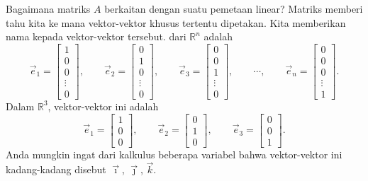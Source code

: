 Bagaimana matriks $A$ berkaitan dengan suatu pemetaan linear?
Matriks memberi tahu kita ke mana
vektor-vektor khusus tertentu dipetakan. Kita memberikan nama kepada vektor-vektor tersebut.
\emph{} dari ${\mathbb R}^n$ adalah
\begin{equation*}
\vec{e}_1 =
\begin{bmatrix}
1 \\ 0 \\ 0 \\ \vdots \\ 0
\end{bmatrix} ,
\qquad
\vec{e}_2 =
\begin{bmatrix}
0 \\ 1 \\ 0 \\ \vdots \\ 0
\end{bmatrix} ,
\qquad
\vec{e}_3 =
\begin{bmatrix}
0 \\ 0 \\ 1 \\ \vdots \\ 0
\end{bmatrix} ,
\qquad
\cdots ,
\qquad
\vec{e}_n =
\begin{bmatrix}
0 \\ 0 \\ 0 \\ \vdots \\ 1
\end{bmatrix} .
\end{equation*}
Dalam ${\mathbb R}^3$, vektor-vektor ini adalah
\begin{equation*}
\vec{e}_1 =
\begin{bmatrix}
1 \\ 0 \\ 0
\end{bmatrix} ,
\qquad
\vec{e}_2 =
\begin{bmatrix}
0 \\ 1 \\ 0
\end{bmatrix} ,
\qquad
\vec{e}_3 =
\begin{bmatrix}
0 \\ 0 \\ 1
\end{bmatrix} .
\end{equation*}
Anda mungkin ingat dari kalkulus beberapa variabel bahwa vektor-vektor ini
kadang-kadang disebut $\vec{\imath}$, $\vec{\jmath}$, $\vec{k}$.
